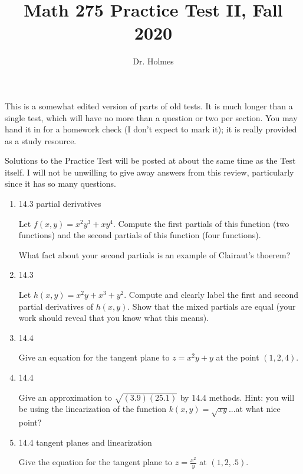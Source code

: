 \documentclass[12pt]{article}
\title{Math 275 Practice Test II, Fall 2020}
\author{Dr. Holmes}
\begin{document}
\maketitle

This is a somewhat edited version of parts of old tests.  It is much longer than a single test, which will have no more than a question or two per section.  
You may hand it in for a homework check (I don't expect to mark it);  it is really provided as a study resource.

Solutions to the Practice Test will be posted at about the same time as the Test itself.  I will not be unwilling to give away answers from this review, particularly since it has so many questions.

\newpage

\begin{enumerate}

\item 14.3 partial derivatives

Let $f(x,y) = x^2y^3 + xy^4$.  Compute the first partials of this function (two functions) and the second partials of this function (four functions).  

What fact about your second partials is an example of Clairaut's thoerem?

\newpage

\item	14.3 

Let $h(x, y) = x^2y + x^3 + y^2$. Compute and clearly label the first  and second partial derivatives of $h(x, y)$. Show that the mixed partials are equal (your work should reveal that you know what this means).

\newpage

\item 14.4 

Give an equation for the tangent plane to $z = x^2y+y$ at the point $(1, 2, 4)$.

\newpage

\item 14.4
 
Give an approximation to	$\sqrt{(3.9)(25.1)}$ by 14.4 methods.
Hint:  you will be using the linearization of the function $k(x, y) =
\sqrt{xy}$...at what nice point?


\newpage

\item  14.4 tangent planes and linearization

Give the equation for the tangent plane to $z=\frac{x^2}y$ at $(1,2,.5)$.


\end{enumerate}
\end{document}
